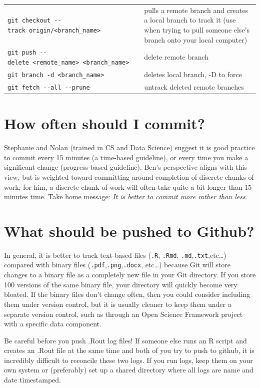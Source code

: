 \documentclass[
]{book}
\begin{document}
\begin{longtable}[]{@{}
  >{\raggedright\arraybackslash}p{}
  >{\raggedright\arraybackslash}p{}@{}}
\texttt{git\ checkout\ -\/-track\ origin/\textless{}branch\_name\textgreater{}} & pulls a remote branch and creates a local branch to track it (use when trying to pull someone else's branch onto your local computer) \\
\texttt{git\ push\ -\/-delete\ \textless{}remote\_name\textgreater{}\ \textless{}branch\_name\textgreater{}} & delete remote branch \\
\texttt{git\ branch\ -d\ \textless{}branch\_name\textgreater{}} & deletes local branch, -D to force \\
\texttt{git\ fetch\ -\/-all\ -\/-prune} & untrack deleted remote branches \\
\end{longtable}

\section{How often should I commit?}\label{how-often-should-i-commit}

Stephanie and Nolan (trained in CS and Data Science) suggest it is good practice to commit every 15 minutes (a time-based guideline), or every time you make a significant change (progress-based guideline). Ben's perspective aligns with this view, but is weighted toward committing around completion of discrete chunks of work; for him, a discrete chunk of work will often take quite a bit longer than 15 minutes time. Take home message: \emph{It is better to commit more rather than less.}

\section{What should be pushed to Github?}\label{what-should-be-pushed-to-github}

In general, it is better to track text-based files (\texttt{.R}, \texttt{.Rmd}, \texttt{.md},\texttt{.txt},etc\ldots) compared with binary files (\texttt{.pdf},\texttt{.png},\texttt{.docx}, etc\ldots) because Git will store changes to a binary file as a completely new file in your Git directory. If you store 100 versions of the same binary file, your directory will quickly become very bloated. If the binary files don't change often, then you could consider including them under version control, but it is usually cleaner to keep them under a separate version control, such as through an Open Science Framework project with a specific data component.

Be careful before you push .Rout log files! If someone else runs an R script and creates an .Rout file at the same time and both of you try to push to github, it is incredibly difficult to reconcile these two logs. If you run logs, keep them on your own system or (preferably) set up a shared directory where all logs are name and date timestamped.
\end{document}
